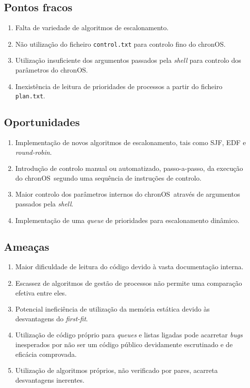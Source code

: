 \documentclass[10pt,oneside]{estiloUBI}
\newcommand{\chronOS}{\textsf{chronOS}}
\begin{document}
	
	\subsection{Pontos fracos}
	
	\begin{enumerate}
		\item Falta de variedade de algoritmos de escalonamento.
		\item Não utilização do ficheiro \verb|control.txt| para controlo fino do \chronOS.
		\item Utilização insuficiente dos argumentos passados pela \textit{shell} para controlo dos parâmetros do \chronOS.
		\item Inexistência de leitura de prioridades de processos a partir do ficheiro \verb|plan.txt|.
	\end{enumerate}
	
	
	\subsection{Oportunidades}
	
	\begin{enumerate}
		\item Implementação de novos algoritmos de escalonamento, tais como \ac{SJF}, \ac{EDF} e \textit{round-robin}.
		\item Introdução de controlo manual ou automatizado, passo-a-passo, da execução do \chronOS~segundo uma sequência de instruções de controlo.
		\item Maior controlo dos parâmetros internos do \chronOS~através de argumentos passados pela \textit{shell}.
		\item Implementação de uma \textit{queue} de prioridades para escalonamento dinâmico.
	\end{enumerate}
	
	
	\subsection{Ameaças}
	
	\begin{enumerate}
		\item Maior dificuldade de leitura do código devido à vasta documentação interna.
		\item Escassez de algoritmos de gestão de processos não permite uma comparação efetiva entre eles.
		\item Potencial ineficiência de utilização da memória estática devido às desvantagens do \textit{first-fit}.
		\item Utilização de código próprio para \textit{queues} e listas ligadas pode acarretar \textit{bugs} inesperados por não ser um código público devidamente escrutinado e de eficácia comprovada.
		\item Utilização de algoritmos próprios, não verificado por pares, acarreta desvantagens inerentes.
	\end{enumerate}
	
\end{document}
